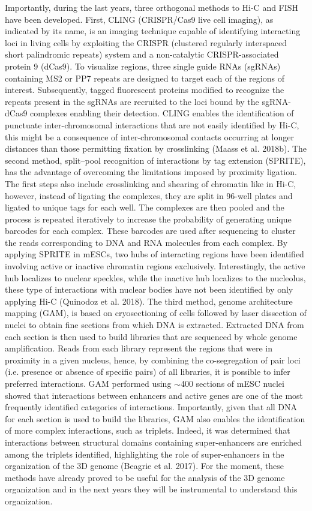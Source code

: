 Importantly, during the last years, three orthogonal methods to Hi-C and FISH have been developed. First, CLING (CRISPR/Cas9 live cell imaging), as indicated by its name, is an imaging technique capable of identifying interacting loci in living cells by exploiting the CRISPR (clustered regularly interspaced short palindromic repeats) system and a non-catalytic CRISPR-associated protein 9 (dCas9). To visualize regions, three single guide RNAs (sgRNAs) containing MS2 or PP7 repeats are designed to target each of the regions of interest. Subsequently, tagged fluorescent proteins modified to recognize the repeats present in the sgRNAs are recruited to the loci bound by the sgRNA-dCas9 complexes enabling their detection. CLING enables the identification of punctuate inter-chromosomal interactions that are not easily identified by Hi-C, this might be a consequence of inter-chromosomal contacts occurring at longer distances than those permitting fixation by crosslinking (Maass et al. 2018b). The second method, split–pool recognition of interactions by tag extension (SPRITE), has the advantage of overcoming the limitations imposed by proximity ligation. The first steps also include crosslinking and shearing of chromatin like in Hi-C, however, instead of ligating the complexes, they are split in 96-well plates and ligated to unique tags for each well. The complexes are then pooled and the process is repeated iteratively to increase the probability of generating unique barcodes for each complex. These barcodes are used after sequencing to cluster the reads corresponding to DNA and RNA molecules from each complex. By applying SPRITE in mESCs, two hubs of interacting regions have been identified involving active or inactive chromatin regions exclusively. Interestingly, the active hub localizes to nuclear speckles, while the inactive hub localizes to the nucleolus, these type of interactions with nuclear bodies have not been identified by only applying Hi-C (Quinodoz et al. 2018). The third method, genome architecture mapping (GAM), is based on cryosectioning of cells followed by laser dissection of nuclei to obtain fine sections from which DNA is extracted. Extracted DNA from each section is then used to build libraries that are sequenced by whole genome amplification. Reads from each library represent the regions that were in proximity in a given nucleus, hence, by combining the co-segregation of pair loci (i.e. presence or absence of specific pairs) of all libraries, it is possible to infer preferred interactions. GAM performed using $\sim$400 sections of mESC nuclei showed that interactions between enhancers and active genes are one of the most frequently identified categories of interactions. Importantly, given that all DNA for each section is used to build the libraries, GAM also enables the identification of more complex interactions, such as triplets. Indeed, it was determined that interactions between structural domains containing super-enhancers are enriched among the triplets identified, highlighting the role of super-enhancers in the organization of the 3D genome (Beagrie et al. 2017). For the moment, these methods have already proved to be useful for the analysis of the 3D genome organization and in the next years they will be instrumental to understand this organization. 